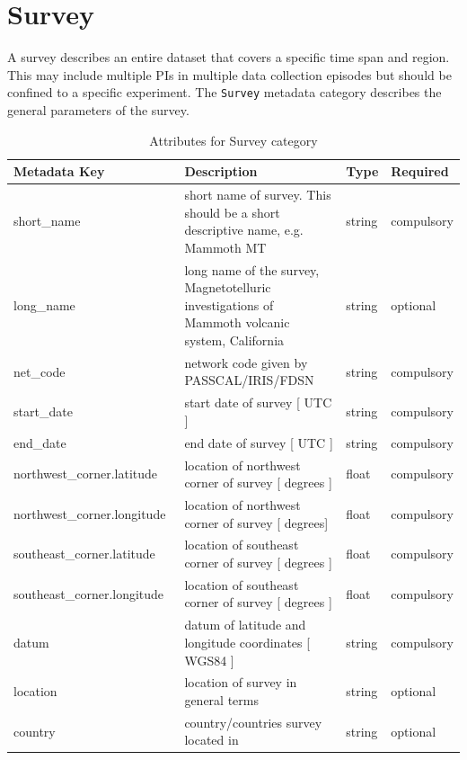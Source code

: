 \documentclass{article}
\begin{document}
\clearpage
\newpage
\section{Survey}

A survey describes an entire dataset that covers a specific time span and region. This may include multiple PIs in multiple data collection episodes but should be confined to a specific experiment. The \verb|Survey| metadata category describes the general parameters of the survey.

\begin{table}[htb!]
	\centering
	\caption[Attributes for Survey]{Attributes for Survey category}
	\begin{tabular}{|l|p{3.65in}|l|l|}
		\hline
		\textbf{Metadata Key} & \textbf{Description} & \textbf{Type} & \textbf{Required} \\ \hline
		short\_name\ & short name of survey. This should be a short descriptive name, e.g. Mammoth MT & string & compulsory \\ \hline
		long\_name\ & long name of the survey, Magnetotelluric investigations of Mammoth volcanic system, California & string & optional \\ \hline
		net\_code\ & network code given by PASSCAL/IRIS/FDSN & string & compulsory \\ \hline
		start\_date\ & start date of survey [ UTC ] & string & compulsory \\ \hline
		end\_date\ & end date of survey [ UTC ] & string & compulsory \\ \hline
		northwest\_corner.latitude\ & location of northwest corner of survey [ degrees ] & float & compulsory \\ \hline
		northwest\_corner.longitude\ & location of northwest corner of survey [ degrees] & float & compulsory \\ \hline
		southeast\_corner.latitude\ & location of southeast corner of survey  [ degrees ] & float & compulsory \\ \hline
		southeast\_corner.longitude\ & location of southeast corner of survey  [ degrees ] & float & compulsory \\ \hline
		datum\ & datum of latitude and longitude coordinates [ WGS84 ] & string & compulsory \\ \hline
		location\ & location of survey in general terms & string & optional \\ \hline
		country\ & country/countries survey located in & string & optional \\ \hline

\end{tabular}
\end{table}
\end{document}
